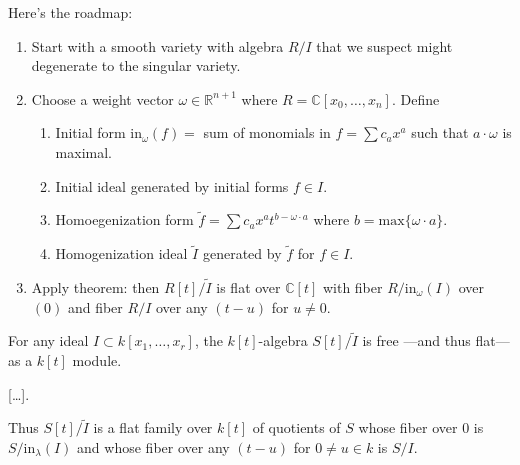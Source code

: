 \noindent
Here's the roadmap:
\begin{enumerate}
\item Start with a smooth variety
with algebra $R/I$ that we suspect
might degenerate to the singular
variety.

\item Choose a weight vector
$\omega \in \mathbb{R}^{n+1}$
where $R = \mathbb{C}[x_0,…,x_n]$.
Define
\begin{enumerate}
\item Initial form
$\text{in}_\omega(f) = $
sum of monomials in $f= \sum c_a x^a$
such that $a\cdot \omega$
is maximal.

\item Initial ideal generated
by initial forms $f \in I$.

\item Homoegenization form
$\tilde{f} = \sum c_a x^at^{b-\omega\cdot a}$
where $b = \text{max}\{\omega \cdot a\}$.

\item Homogenization ideal $\tilde{I}$
generated by $\tilde{f}$ for $f \in I$.
\end{enumerate}
\item Apply theorem: then
$R[t]/\tilde{I}$
is flat over $\mathbb{C}[t]$
with fiber $R/\text{in}_\omega(I)$
over $(0)$ and fiber $R/I$ over 
any $(t-u)$ for $u\neq 0$.
\end{enumerate}

\begin{theorem}
\label{theorem-grobner-flat-morphism}
For any ideal $I \subset k[x_1,\ldots,x_r]$,
the $k[t]$-algebra $S[t]/\tilde{I}$ is free
---and thus flat--- as a $k[t]$ module.

[…].

Thus $S[t]/\tilde{I}$ is a flat family over
$k[t]$ of quotients of $S$ whose fiber over
$0$ is $S/\text{in}_\lambda(I)$ and whose
fiber over any $(t-u)$ for $0 \neq u \in k$
is $S/I$.

\end{theorem}





